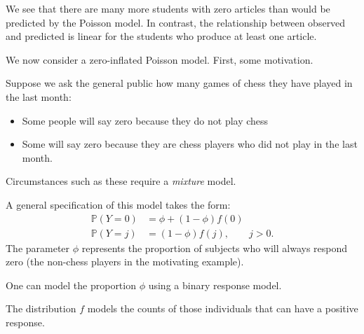 \documentclass[
  ignorenonframetext,
]{beamer}
\providecommand{\tightlist}{%
  \setlength{\itemsep}{0pt}\setlength{\parskip}{0pt}}
\begin{document}
\begin{frame}{}
\protect\hypertarget{section-32}{}
We see that there are many more students with zero articles than would
be predicted by the Poisson model. In contrast, the relationship between
observed and predicted is linear for the students who produce at least
one article.

\vspace{12pt}

We now consider a zero-inflated Poisson model. First, some motivation.

\vspace{12pt}

Suppose we ask the general public how many games of chess they have
played in the last month:

\begin{itemize}
\tightlist
\item
  Some people will say zero because they do not play chess
\item
  Some will say zero because they are chess players who did not play in
  the last month.
\end{itemize}

\vspace{12pt}

Circumstances such as these require a \emph{mixture} model.
\end{frame}

\begin{frame}{}
\protect\hypertarget{section-33}{}
A general specification of this model takes the form: \begin{align*}
  \mathbb{P}(Y = 0) &= \phi + (1 - \phi)f(0) \\
  \mathbb{P}(Y = j) &= (1 - \phi)f(j), \qquad j > 0.
\end{align*} The parameter \(\phi\) represents the proportion of
subjects who will always respond zero (the non-chess players in the
motivating example).

\vspace{12pt}

One can model the proportion \(\phi\) using a binary response model.

\vspace{12pt}

The distribution \(f\) models the counts of those individuals that can
have a positive response.
\end{frame}
\end{document}
